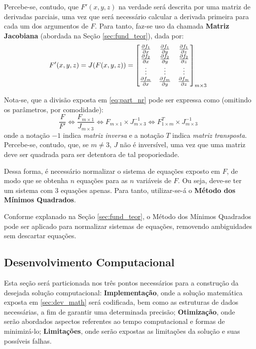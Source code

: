 	Percebe-se, contudo, que $F'(x, y, z)$ na verdade será descrita por uma matriz de derivadas
	parciais, uma vez que será necessário calcular a derivada primeira para cada um dos argumentos
	de $F$. Para tanto, faz-se uso da chamada \textbf{Matriz Jacobiana} (abordada na Seção \ref{sec:fund_teor}),
	dada por:
	\begin{align*}
		F'(x,y,z) = J(F(x,y,z)) =
		\begin{bmatrix}
			\frac{\partial f_1}{\partial x} & \frac{\partial f_1}{\partial y} & \frac{\partial f_1}{\partial z}\\
			\frac{\partial f_2}{\partial x} & \frac{\partial f_2}{\partial y} & \frac{\partial f_2}{\partial z}\\
			\vdots & \vdots & \vdots \\
			\frac{\partial f_m}{\partial x} & \frac{\partial f_m}{\partial y} & \frac{\partial f_m}{\partial z}\\
		\end{bmatrix}_{m\times3}
	\end{align*}

	Nota-se, que a divisão exposta em \ref{eq:part_nr} pode ser expressa como
	(omitindo os parâmetros, por comodidade):
	$$\frac{F}{F'} \iff \frac{F_{m\times1}}{J_{m\times3}} \iff F_{m\times1} \times J_{m\times3}^{-1} \iff F_{1 \times m}^{T} \times J_{m\times3}^{-1} $$
	onde a notação $-1$ indica \textit{matriz inversa} e a notação $T$ indica \textit{matriz transposta}.
	Percebe-se, contudo, que, se $m \neq 3$, $J$ não é inversível, uma vez que uma matriz deve ser
	quadrada para ser detentora de tal proporiedade.

	Dessa forma, é necessário normalizar o sistema de equações exposto em $F$, de modo que se obtenha $n$ equações
	para as $n$ variáveis de $F$. Ou seja, deve-se ter um sistema com $3$ equações apenas. Para tanto, utilizar-se-á
	o \textbf{Método dos Mínimos Quadrados}.

	Conforme explanado na Seção \ref{sec:fund_teor}, o Método dos Mínimos Quadrados pode ser aplicado
	para normalizar sistemas de equações, removendo ambiguidades sem descartar equações.

	\subsection{Desenvolvimento Computacional}
	\label{sec:dev_comp}
	Esta seção será particionada nos três pontos necessários para a construção da desejada solução
	computacional: \textbf{Implementação}, onde a solução matemática exposta em \ref{sec:dev_math}
	será codificada, bem como as estruturas de dados necessárias, a fim de garantir uma determinada
	precisão; \textbf{Otimização}, onde serão abordados aspectos referentes ao tempo computacional
	e formas de minimizá-lo; \textbf{Limitações}, onde serão expostas as limitações da solução e suas
	possíveis falhas.
